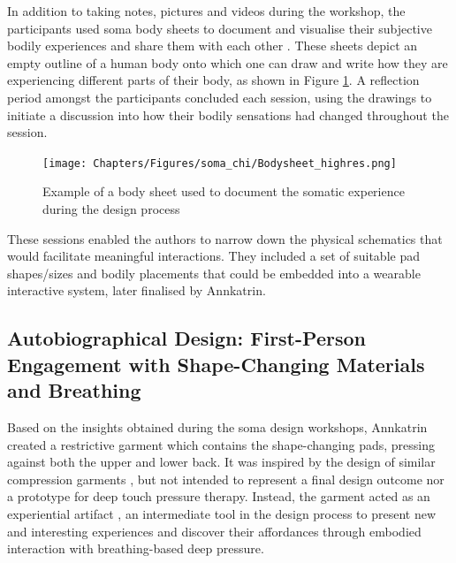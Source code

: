 In addition to taking notes, pictures and videos during the workshop, the participants used soma body sheets to document and visualise their subjective bodily experiences and share them with each other \cite{candy_intimate_2014}. These sheets depict an empty outline of a human body onto which one can draw and write how they are experiencing different parts of their body, as shown in Figure \ref{fig:bodysheets}. A reflection period amongst the participants concluded each session, using the drawings to initiate a discussion into how their bodily sensations had changed throughout the session.

  \begin{figure}[b]
  \centering  
  \texttt{[image: Chapters/Figures/soma\_chi/Bodysheet\_highres.png]}
  \caption{Example of a body sheet used to document the somatic experience during the design process}
  \label{fig:bodysheets}
\end{figure}

These sessions enabled the authors to narrow down the physical schematics that would facilitate meaningful interactions. They included a set of suitable pad shapes/sizes and bodily placements that could be embedded into a wearable interactive system, later finalised by Annkatrin.


\subsection{Autobiographical Design: First-Person Engagement with Shape-Changing Materials and Breathing}
\label{sec:first_person_engagement}

Based on the insights obtained during the soma design workshops, Annkatrin created a restrictive garment which contains the shape-changing pads, pressing against both the upper and lower back. It was inspired by the design of similar compression garments \cite{vaucelle_design_2009, foo_user_2019}, but not intended to represent a final design outcome nor a prototype for deep touch pressure therapy. Instead, the garment acted as an experiential artifact \cite{sundstrom_experiential_2011}, an intermediate tool in the design process to present new and interesting experiences and discover their affordances through embodied interaction with breathing-based deep pressure.


